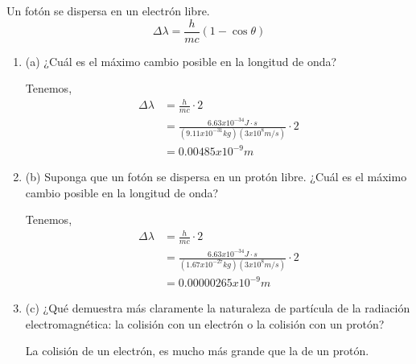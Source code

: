     
    \begin{problema}
        Un fotón se dispersa en un electrón libre. 
        $$\Delta \lambda = \frac{h}{mc}(1-\cos \theta)$$
        \begin{enumerate}
            \item (a) ¿Cuál es el máximo cambio posible en la longitud de onda?
            \begin{sol}
                Tenemos, 
                \begin{align*}
                    \Delta \lambda &= \frac{h}{mc}\cdot 2\\
                                   &= \frac{6.63x10^{-34}J\cdot s}{(9.11x10^{-31}kg)(3x10^8 m/s)}\cdot 2\\
                                   &= 0.00485 x10^{-9}m
                \end{align*}
            \end{sol} 
            \item (b) Suponga que un fotón se dispersa en un protón libre. ¿Cuál es el máximo cambio posible en la longitud de onda?
            \begin{sol}
                Tenemos, 
                \begin{align*}
                    \Delta \lambda &= \frac{h}{mc}\cdot 2\\
                                   &= \frac{6.63x10^{-34}J\cdot s}{(1.67x10^{-27}kg)(3x10^8 m/s)}\cdot 2\\
                                   &= 0.00000265x10^{-9}m
                \end{align*}
            \end{sol} 
            \item (c) ¿Qué demuestra más claramente la naturaleza de partícula de la radiación electromagnética: la colisión con un electrón o la colisión con un protón?
            \begin{sol}
                La colisión de un electrón, es mucho más grande que la de un protón. 
            \end{sol}
        \end{enumerate}        
        
    \end{problema}
    

